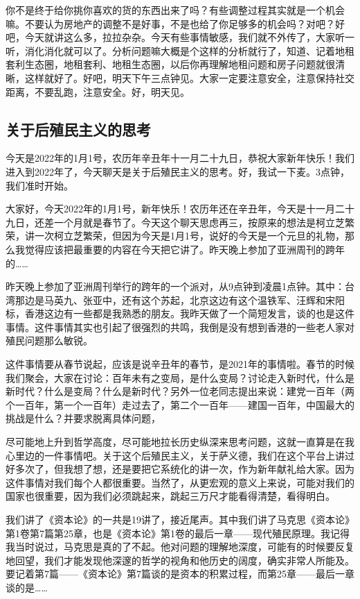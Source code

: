 \documentclass[UTF8, 12pt, a4paper]{ctexrep}
\begin{document}
你不是终于给你挑你喜欢的货的东西出来了吗？有些调整过程其实就是一个机会嘛。不要认为房地产的调整不是好事，不是也给了你足够多的机会吗？对吧？好吧，今天就讲这么多，拉拉杂杂。今天有些事情敏感，我们就不外传了，大家听一听，消化消化就可以了。分析问题嘛大概是个这样的分析就行了，知道、记着地租套利生态圈，地租套利、地租生态圈，以后你再理解地租问题和房子问题就很清晰，这样就好了。好吧，明天下午三点钟见。大家一定要注意安全，注意保持社交距离，不要乱跑，注意安全。好，明天见。

\subsection{关于后殖民主义的思考}

今天是2022年的1月1号，农历年辛丑年十一月二十九日，恭祝大家新年快乐！我们进入到2022年了，今天聊天是关于后殖民主义的思考。好，我试一下麦。3点钟，我们准时开始。

大家好，今天2022年的1月1号，新年快乐！农历年还在辛丑年，今天是十一月二十九日，还差一个月就是春节了。今天这个聊天思虑再三，按原来的想法是柯立芝繁荣，讲一次柯立芝繁荣，但因为今天是1月1号，说好的今天是一个元旦的礼物，那么我觉得应该把最重要的内容在今天把它讲了。昨天晚上参加了亚洲周刊的跨年的……

昨天晚上参加了亚洲周刊举行的跨年的一个派对，从9点钟到凌晨1点钟。其中：台湾那边是马英九、张亚中，还有这个苏起，北京这边有这个温铁军、汪辉和宋阳标，香港这边有一些都是我熟悉的朋友。我昨天做了一个简短发言，谈的也是这件事情。这件事情其实也引起了很强烈的共鸣，我倒是没有想到香港的一些老人家对殖民问题那么敏锐。

这件事情要从春节说起，应该是说辛丑年的春节，是2021年的事情啦。春节的时候我们聚会，大家在讨论：百年未有之变局，是什么变局？讨论走入新时代，什么是新时代？什么是变局？什么是新时代？另外一位老同志提出来说：建党一百年（两个一百年，第一个一百年）走过去了，第二个一百年——建国一百年，中国最大的挑战是什么？并要求脱离具体问题，

尽可能地上升到哲学高度，尽可能地拉长历史纵深来思考问题，这就一直算是在我心里边的一件事情吧。关于这个后殖民主义，关于萨义德，我们在这个平台上讲过好多次了，但我想了想，还是要把它系统化的讲一次，作为新年献礼给大家。因为这件事情对我们每个人都很重要。当然了，从更宏观的意义上来说，可能对我们的国家也很重要，因为我们必须跳起来，跳起三万尺才能看得清楚，看得明白。

我们讲了《资本论》的一共是19讲了，接近尾声。其中我们讲了马克思《资本论》第1卷第7篇第25章，也是《资本论》第1卷的最后一章——现代殖民原理。我记得我当时说过，马克思是真的了不起。他对问题的理解地深度，可能有的时候要反复地回望，我们才能发现他深邃的哲学的视角和他历史的阔度，确实非常人所能及。要记着第7篇——《资本论》第7篇谈的是资本的积累过程，而第25章——最后一章谈的是……
\end{document}
